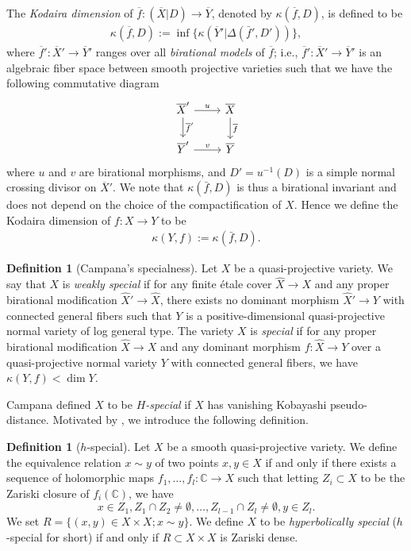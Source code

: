 \documentclass[11pt,english]{smfart}
\theoremstyle{plain}
\theoremstyle{definition}
\newtheorem{dfn}[thm]{Definition}
\theoremstyle{remark}
\numberwithin{equation}{subsection}
\theoremstyle{plain}
\begin{document}
 The \emph{Kodaira dimension} of $\overline{f}:(\overline{X}| D)\to \overline{Y}$, denoted by $\kappa(\overline{f}, D)$, is defined to be 
\begin{align} \label{eq:Kodaira}
\kappa(\overline{f}, D):=\inf \{\kappa(\overline{Y}'|\Delta(\bar{f}', D')) \},
\end{align} 
where $\overline{f}':\overline{X}'\to \overline{Y}'$ ranges over all \emph{birational models} of $\overline{f}$; i.e., $\overline{f}':\overline{X}'\to \overline{Y}'$ is an algebraic fiber space between smooth projective varieties   such that we have the following commutative diagram
\begin{equation*}
	\begin{tikzcd}
		\overline{X}' \arrow[r, "u"]\arrow[d, "\overline{f}'"] & \overline{X}\arrow[d, "\overline{f}"] \\
		\overline{Y}' \arrow[r, "v"] & \overline{Y} 
 	\end{tikzcd}
\end{equation*}
where $u$ and $v$ are  birational morphisms, and \(D' = u^{-1}(D)\) is a simple normal crossing divisor on \(\overline{X}'\). We note that $\kappa(\bar{f},D)$ is thus a birational invariant and does not depend on the choice of  the compactification  of $X$. Hence we  define the Kodaira dimension of $f:X\to Y$ to be
\begin{align}\label{eq:Kodaira2}
	 \kappa(Y,f):=\kappa(\bar{f},D).
\end{align} 

 \begin{dfn}[Campana's specialness]\label{def:special}
Let $X$ be a   quasi-projective variety. 
	 We say that $X$ is \emph{weakly special} if for any finite \'etale cover $\widehat{X}\to X$ and any proper birational modification $\widehat{X}'\to \widehat{X}$, there exists no dominant morphism  $\widehat{X}'\to Y$  with  connected general fibers such that $Y$ is a positive-dimensional quasi-projective normal variety of log general type. The variety $X$ is \emph{special} if for  any proper birational modification $\widehat{X}\to X$ and any  dominant morphism $f:\widehat{X}\to Y$ over a quasi-projective normal variety $Y$ with connected general fibers,  we have $\kappa(Y,f)<\dim  {Y}$.
 \end{dfn}

Campana defined $X$ to be \emph{$H$-special} if $X$ has vanishing Kobayashi pseudo-distance.
Motivated by \cite[Definition 9.1]{Cam04}, we introduce the following definition.

\begin{dfn}[$h$-special]\label{defn:20230407}
Let $X$ be a smooth quasi-projective variety.
We define the equivalence relation $x\sim y$ of two points $x,y\in X$ if and only if there exists a sequence of holomorphic maps $f_1,\ldots,f_l:\mathbb C\to X$ such that letting $Z_i\subset X$ to be the Zariski closure of $f_i(\mathbb C)$, we have 
$$x\in Z_1, Z_1\cap Z_2\not=\emptyset, \ldots, Z_{l-1}\cap Z_l\not=\emptyset, y\in Z_l.$$
We set $R=\{ (x,y)\in X\times X; x\sim y\}$.
We define $X$ to be \emph{hyperbolically special} ($h$-special for short) if and only if  $R\subset X\times X$ is Zariski dense.
\end{dfn}
\end{document}
